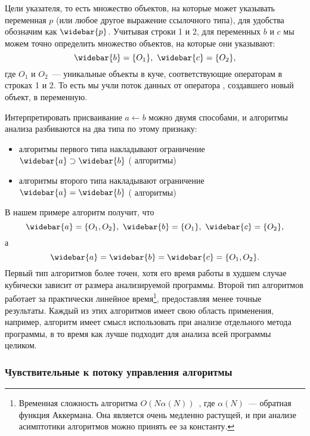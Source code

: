 \documentclass[14pt,titlepage,draft]{extarticle}
\newcommand{\pts}[1]{\widebar{#1}}
\begin{document}
        Цели указателя, то есть множество объектов, на которые может указывать
        переменная $p$ (или любое другое выражение ссылочного типа), для
        удобства обозначим как $\pts{p}$.
        Учитывая строки 1 и 2, для переменных $b$ и $c$ мы можем точно
        определить множество объектов, на которые они указывают:
        \[\pts{b} = \{O_1\},\ \pts{c} = \{O_2\},\]
        где $O_1$ и $O_2$~--- уникальные объекты в куче, соответствующие
        операторам  в строках 1 и 2.  То есть мы учли поток данных от
        оператора , создавшего новый объект, в переменную.

        Интерпретировать присваивание $a \gets b$ можно двумя способами,
        и алгоритмы анализа разбиваются на два типа по этому признаку:
        \begin{itemize}
          \item алгоритмы первого типа накладывают ограничение
                $\pts{a} \supset \pts{b}$
                ( алгоритмы)~\cite{andersen}
          \item алгоритмы второго типа накладывают ограничение
                $\pts{a} = \pts{b}$
                ( алгоритмы)~\cite{steensgaard}
        \end{itemize}
        В нашем примере  алгоритм получит, что
        \[\pts{a} = \{O_1, O_2\},\ \pts{b} = \{O_1\},\ \pts{c} = \{O_2\},\]
        а 
        \[\pts{a} = \pts{b} = \pts{c} = \{O_1, O_2\}.\]
        Первый тип алгоритмов более точен, хотя его время работы в худшем
        случае кубически зависит от размера анализируемой программы.
        Второй тип алгоритмов работает за практически линейное время\footnote{
          Временная сложность  алгоритма
          $O(N \alpha(N))$~\cite{steensgaard}, где $\alpha(N)$~--- обратная
          функция Аккермана. Она является очень медленно растущей, и при
          анализе асимптотики алгоритмов можно принять ее за константу.
        },
        предоставляя менее точные результаты.
        Каждый из этих алгоритмов имеет свою область применения, например,
         алгоритм имеет смысл использовать при анализе
        отдельного метода программы, в то время как  лучше
        подходит для анализа всей программы целиком.


      \subsubsection{Чувствительные к потоку управления алгоритмы}
        \label{section:analysis_classification_control_flow}
\end{document}
